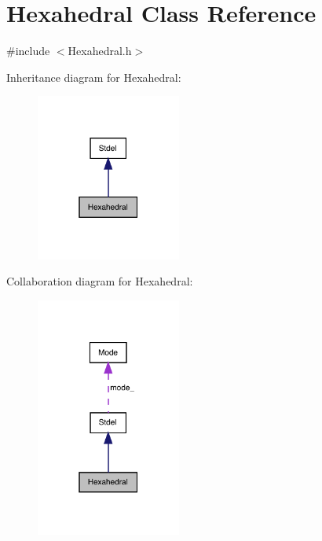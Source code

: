\hypertarget{classHexahedral}{}\section{Hexahedral Class Reference}
\label{classHexahedral}


{\ttfamily \#include $<$Hexahedral.\+h$>$}



Inheritance diagram for Hexahedral\+:
\nopagebreak
\begin{figure}[H]
\begin{center}
\leavevmode
\includegraphics[width=135pt]{classHexahedral__inherit__graph}
\end{center}
\end{figure}


Collaboration diagram for Hexahedral\+:
\nopagebreak
\begin{figure}[H]
\begin{center}
\leavevmode
\includegraphics[width=135pt]{classHexahedral__coll__graph}
\end{center}
\end{figure}
